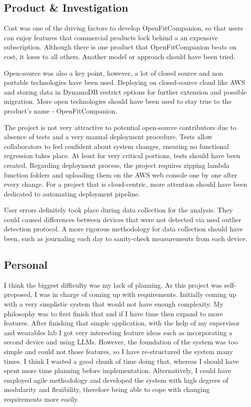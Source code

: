 \subsection{Product \& Investigation}
Cost was one of the driving factors to develop OpenFitCompanion, so that users can enjoy features that commercial products lock behind a an expensive subscription. Although there is one product that OpenFitCompanion beats on cost, it loses to all others. Another model or approach should have been tried. 

Open-source was also a key point, however, a lot of closed source and non portable technologies have been used. Deploying on closed-source cloud like AWS and storing data in DynamoDB restrict options for further extension and possible migration. More open technologies should have been used to stay true to the product's name - OpenFitCompanion.

The project is not very attractive to potential open-source contributors due to absence of tests and a very manual deployment procedure. Tests allow collaborators to feel confident about system changes, ensuring no functional regression takes place. At least for very critical portions, tests should have been created. Regarding deployment process, the project requires zipping lambda function folders and uploading them on the AWS web console one by one after every change. For a project that is cloud-centric, more attention should have been dedicated to automating deployment pipeline.

User errors definitely took place during data collection for the analysis. They could caused differences between devices that were not detected via used outlier detection protocol. A more rigorous methodology for data collection should have been, such as journaling each day to sanity-check measurements from each device. 
\subsection{Personal}
I think the biggest difficulty was my lack of planning. As this project was self-proposed, I was in charge of coming up with requirements. Initially coming up with a very simplistic system that would not have enough complexity. My philosophy was to first finish that and if I have time then expand to more features. After finishing that simple application, with the help of my supervisor and wearables lab I got very interesting feature ideas  such as incorporating a second device and using LLMs. However, the foundation of the system was too simple and could not those features, so I have re-structured the system many times. I think I wasted a good chunk of time doing that, whereas I should have spent more time planning before implementation. Alternatively, I could have employed agile methodology and developed the system with high degrees of modularity and flexibility, therefore being able to cope with changing requirements more easily.

